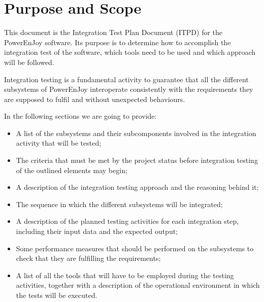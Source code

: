 \section{Purpose and Scope}
This document is the Integration Test Plan Document (ITPD) for the PowerEnJoy
software. Its purpose is to determine how to accomplish the
integration test of the software, which tools need to be used and which approach
will be followed.

Integration testing is a fundamental activity to guarantee that all the different subsystems of PowerEnJoy interoperate consistently with the requirements they are supposed to fulfil and without unexpected behaviours.

In the following sections we are going to provide:
\begin{itemize}
\item A list of the subsystems and their subcomponents involved in the integration activity that will be tested;
\item The criteria that must be met by the project status before integration testing of the outlined elements may begin;
\item A description of the integration testing approach and the reasoning behind it;
\item The sequence in which the different subsystems will be integrated;
\item A description of the planned testing activities for each integration step, including their input data and the expected output;
\item Some performance measures that should be performed on the subsystems to check that they are fulfilling the requirements;
\item A list of all the tools that will have to be employed during the testing activities, together with a description of the operational environment in which the tests will be executed.
\end{itemize} 
